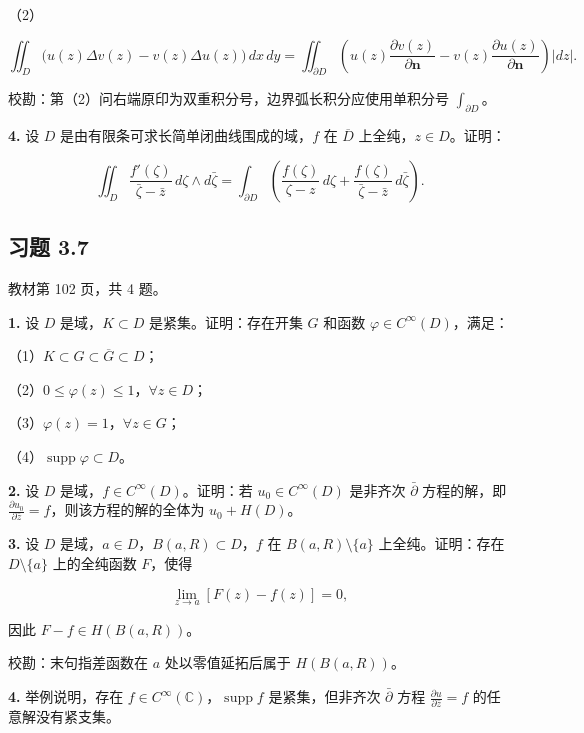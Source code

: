 \documentclass[11pt,a4paper]{article}
\begin{document}
（2）

\[
\iint_D\bigl(u(z)\Delta v(z)-v(z)\Delta u(z)\bigr)\,dx\,dy
=\iint_{\partial D}\left(u(z)\frac{\partial v(z)}{\partial\boldsymbol n}
-v(z)\frac{\partial u(z)}{\partial\boldsymbol n}\right)|dz|.
\]

校勘：第（2）问右端原印为双重积分号，边界弧长积分应使用单积分号
\(\int_{\partial D}\)。

\par{}
\noindent\textbf{4.} 设 \(D\) 是由有限条可求长简单闭曲线围成的域，\(f\) 在
\(\overline D\) 上全纯，\(z\in D\)。证明：

\[
\iint_D\frac{f'(\zeta)}{\bar\zeta-\bar z}\,d\zeta\wedge d\bar\zeta
=\int_{\partial D}\left(\frac{f(\zeta)}{\zeta-z}\,d\zeta
+\frac{f(\zeta)}{\bar\zeta-\bar z}\,d\bar\zeta\right).
\]

\subsection{习题 3.7}\label{ch03-practice-ux4e60ux9898-37}

教材第 102 页，共 4 题。

\par{}
\noindent\textbf{1.} 设 \(D\) 是域，\(K\subset D\) 是紧集。证明：存在开集 \(G\)
和函数 \(\varphi\in C^\infty(D)\)，满足：

（1）\(K\subset G\subset\overline G\subset D\)；

（2）\(0\le\varphi(z)\le1\)，\(\forall z\in D\)；

（3）\(\varphi(z)=1\)，\(\forall z\in G\)；

（4）\(\operatorname{supp}\varphi\subset D\)。

\par{}
\noindent\textbf{2.} 设 \(D\) 是域，\(f\in C^\infty(D)\)。证明：若
\(u_0\in C^\infty(D)\) 是非齐次 \(\bar\partial\) 方程的解，即
\(\frac{\partial u_0}{\partial\bar z}=f\)，则该方程的解的全体为
\(u_0+H(D)\)。

\par{}
\noindent\textbf{3.} 设 \(D\) 是域，\(a\in D\)，\(B(a,R)\subset D\)，\(f\) 在
\(B(a,R)\setminus\{a\}\) 上全纯。证明：存在 \(D\setminus\{a\}\)
上的全纯函数 \(F\)，使得

\[
\lim_{z\to a}[F(z)-f(z)]=0,
\]

因此 \(F-f\in H(B(a,R))\)。

校勘：末句指差函数在 \(a\) 处以零值延拓后属于 \(H(B(a,R))\)。

\par{}
\noindent\textbf{4.} 举例说明，存在
\(f\in C^\infty(\mathbb C)\)，\(\operatorname{supp}f\) 是紧集，但非齐次
\(\bar\partial\) 方程 \(\frac{\partial u}{\partial\bar z}=f\)
的任意解没有紧支集。
\end{document}
